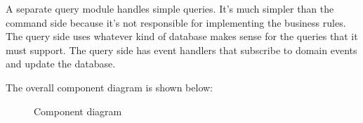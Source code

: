 A separate query module handles simple queries. It’s much simpler than the command side because it’s not responsible for implementing the business rules. The query side uses whatever kind of database makes sense for the queries that it must support. The query side has event handlers that subscribe to domain events and update
the database.

The overall component diagram is shown below:


\begin{figure}[H]
    \caption{\label{fig:component_diagram}Component diagram}
\end{figure}

